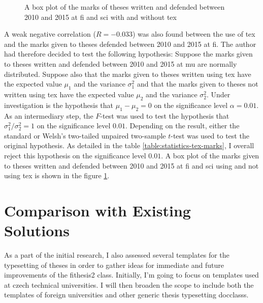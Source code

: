 \begin{figure}
    \caption{A box plot of the marks of theses written and defended between 2010 and 2015 at \gls{fi} and \gls{sci} with and without \gls{tex}}
    \label{fig:statistics-marks}
  \end{figure}

  A weak negative correlation ($R=-0.033$) was also found between the use of \gls{tex} and the marks given to theses defended between 2010 and 2015 at \gls{fi}. The author had therefore decided to test the following \gls{hypothesis}: Suppose the marks given to theses written and defended between 2010 and 2015 at \gls{mu} are normally distributed. Suppose also that the marks given to theses written using \gls{tex} have the expected value $\mu_1$ and the variance $\sigma_1^2$ and that the marks given to theses not written using \gls{tex} have the expected value $\mu_2$ and the variance $\sigma_2^2$. Under investigation is the \gls{hypothesis} that $\mu_1-\mu_2=0$ on the significance level $\alpha=0.01$. As an intermediary step, the $F$-test was used to test the \gls{hypothesis} that $\sigma_1^2/\sigma_2^2=1$ on the significance level $0.01$. Depending on the result, either the standard or Welsh's two-tailed unpaired two-sample $t$-test was used to test the original \gls{hypothesis}. As detailed in the table \ref{table:statistics-tex-marks}, I overall reject this \gls{hypothesis} on the significance level $0.01$. A box plot of the marks given to theses written and defended between 2010 and 2015 at \gls{fi} and \gls{sci} using and not using \gls{tex} is shown in the figure \ref{fig:statistics-marks}.

  \section{Comparison with Existing Solutions}
  As a part of the initial research, I also assessed several templates for the typesetting of theses in order to gather ideas for immediate and future improvements of the fithesis2 class. Initially, I'm going to focus on templates used at czech technical universities. I will then broaden the scope to include both the templates of foreign universities and other generic thesis typesetting \glspl{docclass}.

